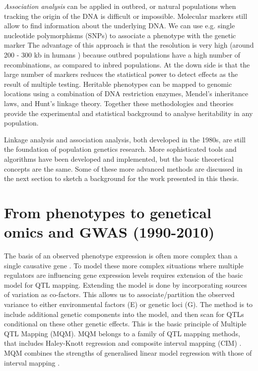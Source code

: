 \emph{Association analysis} can be applied in outbred, or natural populations when tracking the origin of the DNA is difficult 
or impossible. Molecular markers still allow to find information about the underlying DNA. We can use e.g. single nucleotide 
polymorphisms (SNPs) to associate a phenotype with the genetic marker \cite{Mehta:2013} The advantage of this approach is that 
the resolution is very high (around 200 - 300 kb in humans \cite{HapMap:2005}) because outbred populations have a high number of 
recombinations, as compared to inbred populations. At the down side is that the large number of markers reduces the statistical 
power to detect effects as the result of multiple testing. Heritable phenotypes can be mapped to genomic locations using a 
combination of DNA restriction enzymes, Mendel's inheritance laws, and Hunt's linkage theory. Together these methodologies and 
theories provide the experimental and statistical background to analyse heritability in any population.

Linkage analysis and association analysis, both developed in the 1980s, are still the foundation of population genetics research. 
More sophisticated tools and algorithms have been developed and implemented, but the basic theoretical concepts are the same. 
Some of these more advanced methods are discussed in the next section to sketch a background for the work presented in this 
thesis. 

\section{From phenotypes to genetical omics and GWAS (1990-2010)}

The basis of an observed phenotype expression is often more complex than a single causative gene \cite{Sinha:2006, 
West:2007}. To model these more complex situations where multiple regulators are influencing gene expression levels requires extension of 
the basic model for QTL mapping. Extending the model is done by incorporating sources of variation as co-factors. This 
allows us to associate/partition the observed variance to either environmental factors (E) or genetic loci (G). The method 
is to include additional genetic components into the model, and then scan for QTLs conditional on these other genetic effects. 
This is the basic principle of Multiple QTL Mapping (MQM). MQM belongs to a family of QTL mapping methods, that includes 
Haley-Knott regression \cite{Haley:1992} and composite interval mapping (CIM) \cite{Zeng:1994}. MQM combines the strengths 
of generalised linear model regression with those of interval mapping \cite{Jansen:1993, Jansen:1994b}.

